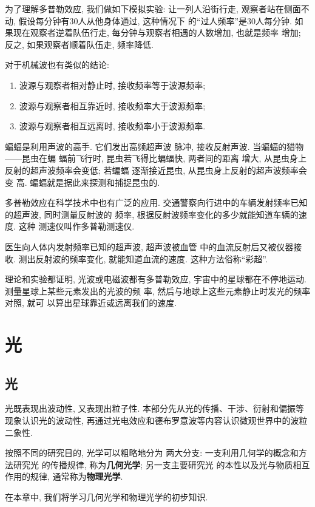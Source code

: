\documentclass[11pt,a4paper]{ctexbook}
\begin{document}
为了理解多普勒效应, 我们做如下模拟实验: 让一列人沿街行走,
观察者站在侧面不动, 假设每分钟有30人从他身体通过, 这种情况下
的``过人频率''是30人每分钟.
如果现在观察者逆着队伍行走, 每分钟与观察者相遇的人数增加, 也就是频率
增加; 反之, 如果观察者顺着队伍走, 频率降低.

对于机械波也有类似的结论:
\begin{enumerate}
    \item 波源与观察者相对静止时, 接收频率等于波源频率;
    \item 波源与观察者相互靠近时, 接收频率大于波源频率;
    \item 波源与观察者相互远离时, 接收频率小于波源频率.
\end{enumerate}

蝙蝠是利用声波的高手. 它们发出高频超声波
脉冲, 接收反射声波. 当蝙蝠的猎物——昆虫在蝙
蝠前飞行时, 昆虫若飞得比蝙蝠快, 两者间的距离
增大, 从昆虫身上反射的超声波频率会变低; 若蝙蝠
逐渐接近昆虫, 从昆虫身上反射的超声波频率会变
高. 蝙蝠就是据此来探测和捕捉昆虫的.

多普勒效应在科学技术中也有广泛的应用.
交通警察向行进中的车辆发射频率已知的超声波, 同时测量反射波的
频率, 根据反射波频率变化的多少就能知道车辆的速度. 这种
测速仪叫作多普勒测速仪.

医生向人体内发射频率已知的超声波, 超声波被血管
中的血流反射后又被仪器接收. 测出反射波的频率变化,
就能知道血流的速度. 这种方法俗称``彩超''.

理论和实验都证明, 光波或电磁波都有多普勒效应,
宇宙中的星球都在不停地运动. 测量星球上某些元素发出的光波的频
率, 然后与地球上这些元素静止时发光的频率对照, 就可
以算出星球靠近或远离我们的速度.

\part{光}
\chapter{光}
\label{光章节}

光既表现出波动性, 又表现出粒子性. 本部分先从光的传播、干涉、衍射和偏振等现象认识光的波动性, 再通过光电效应和德布罗意波等内容认识微观世界中的波粒二象性.

按照不同的研究目的, 光学可以粗略地分为
两大分支: 一支利用几何学的概念和方法研究光
的传播规律, 称为\textbf{几何光学}; 另一支主要研究光
的本性以及光与物质相互作用的规律, 通常称为\textbf{物理光学}.

在本章中, 我们将学习几何光学和物理光学的初步知识.
\end{document}
